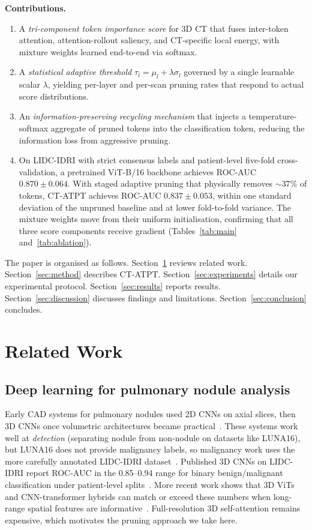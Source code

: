 \documentclass[journal]{IEEEtran}
\begin{document}
\textbf{Contributions.}
\begin{enumerate}
    \item A \emph{tri-component token importance score} for 3D CT that fuses
    inter-token attention, attention-rollout saliency, and CT-specific local
    energy, with mixture weights learned end-to-end via softmax.
    \item A \emph{statistical adaptive threshold}
    $\tau_l = \mu_l + \lambda \sigma_l$ governed by a single learnable scalar
    $\lambda$, yielding per-layer and per-scan pruning rates that respond to
    actual score distributions.
    \item An \emph{information-preserving recycling mechanism} that injects a
    temperature-softmax aggregate of pruned tokens into the classification
    token, reducing the information loss from aggressive pruning.
    \item On LIDC-IDRI with strict consensus labels and patient-level
    five-fold cross-validation, a pretrained ViT-B/16 backbone achieves
    ROC-AUC $0.870 \pm 0.064$. With staged adaptive pruning that physically
    removes ${\sim}37\%$ of tokens, CT-ATPT achieves ROC-AUC
    $0.837 \pm 0.053$, within one standard deviation of the unpruned baseline
    and at lower fold-to-fold variance. The mixture weights move from their
    uniform initialisation, confirming that all three score components receive
    gradient (Tables~\ref{tab:main} and~\ref{tab:ablation}).
\end{enumerate}

The paper is organised as follows. Section~\ref{sec:related} reviews related
work. Section~\ref{sec:method} describes CT-ATPT. Section~\ref{sec:experiments}
details our experimental protocol. Section~\ref{sec:results} reports results.
Section~\ref{sec:discussion} discusses findings and limitations.
Section~\ref{sec:conclusion} concludes.

\section{Related Work}\label{sec:related}

\subsection{Deep learning for pulmonary nodule analysis}
Early CAD systems for pulmonary nodules used 2D CNNs on axial slices, then 3D
CNNs once volumetric architectures became
practical~\cite{setio2017,liao2019}. These systems work well at
\emph{detection} (separating nodule from non-nodule on datasets like LUNA16),
but LUNA16 does not provide malignancy labels, so malignancy work uses the
more carefully annotated LIDC-IDRI dataset~\cite{armato2011}. Published 3D
CNNs on LIDC-IDRI report ROC-AUC in the 0.85--0.94 range for binary
benign/malignant classification under patient-level
splits~\cite{hancock2016,xie2019}. More recent work shows that 3D ViTs and
CNN-transformer hybrids can match or exceed these numbers when long-range
spatial features are informative~\cite{he2021}. Full-resolution 3D
self-attention remains expensive, which motivates the pruning approach we take
here.
\end{document}
